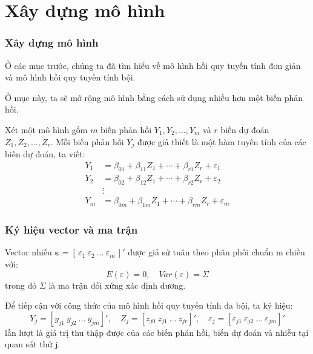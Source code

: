 \section{Xây dựng mô hình}
\begin{frame}
\frametitle{Xây dựng mô hình}
Ở các mục trước, chúng ta đã tìm hiểu về mô hình hồi quy tuyến tính đơn giản và mô hình hồi quy tuyến tính bội. 

Ở mục này, ta sẽ mở rộng mô hình bằng cách sử dụng nhiều hơn một biến phản hồi. 

Xét một mô hình gồm $m$ biến phản hồi $Y_1, Y_2, \dots, Y_m$ và $r$ biến dự đoán $Z_1, Z_2, \dots, Z_r$.  
Mỗi biến phản hồi $Y_j$ được giả thiết là một hàm tuyến tính của các biến dự đoán, ta viết:
\[
\begin{aligned}
Y_1 &= \beta_{01} + \beta_{11}Z_1 + \cdots + \beta_{r1}Z_r + \varepsilon_1 \\
Y_2 &= \beta_{02} + \beta_{12}Z_1 + \cdots + \beta_{r2}Z_r + \varepsilon_2 \\
&\vdots \\
Y_m &= \beta_{0m} + \beta_{1m}Z_1 + \cdots + \beta_{rm}Z_r + \varepsilon_m
\end{aligned}
\]
\end{frame}

\begin{frame}
\frametitle{Ký hiệu vector và ma trận}
Vector nhiễu $\boldsymbol{\varepsilon} = [\,\varepsilon_1 \ \varepsilon_2 \ \dots \ \varepsilon_m\,]'$ được giả sử tuân theo phân phối chuẩn m chiều với:
\[
E(\varepsilon) = 0, \quad Var(\varepsilon) = \Sigma
\]
trong đó $\Sigma$ là ma trận đối xứng xác định dương.

Để tiếp cận với công thức của mô hình hồi quy tuyến tính đa bội, ta ký hiệu:
\[
Y_j = [y_{j1} \ y_{j2} \ \dots \ y_{jm}]', \quad
Z_j = [z_{j0} \ z_{j1} \ \dots \ z_{jr}]', \quad
\varepsilon_{j} = [\varepsilon_{j1} \ \varepsilon_{j2} \ \dots \ \varepsilon_{jm}]'
\]
lần lượt là giá trị thu thập được của các biến phản hồi, biến dự đoán và nhiễu tại quan sát thứ j.
\end{frame}

